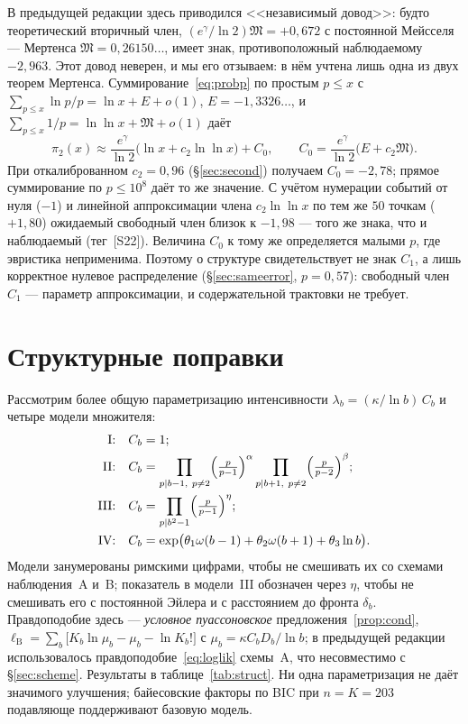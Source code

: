 \documentclass[11pt,a4paper]{article}
\theoremstyle{plain}
\theoremstyle{remark}
\newcommand{\eg}{e^{\gamma}}
\begin{document}
В предыдущей редакции здесь приводился <<независимый довод>>: будто теоретический
вторичный член, $(\eg/\ln2)\mathfrak M=+0{,}672$ с постоянной Мейсселя ---
Мертенса $\mathfrak M=0{,}26150\ldots$, имеет знак, противоположный наблюдаемому
$-2{,}963$. Этот довод неверен, и мы его отзываем: в нём учтена лишь одна из двух
теорем Мертенса. Суммирование~\eqref{eq:probp} по простым $p\le x$ с
$\sum_{p\le x}\ln p/p=\ln x+E+o(1)$, $E=-1{,}3326\ldots$, и
$\sum_{p\le x}1/p=\ln\ln x+\mathfrak M+o(1)$ даёт
\[
\pi_2(x)\approx\frac{\eg}{\ln2}\bigl(\ln x+c_2\ln\ln x\bigr)+C_0,\qquad
C_0=\frac{\eg}{\ln2}\bigl(E+c_2\mathfrak M\bigr).
\]
При откалиброванном $c_2=0{,}96$ (\S\ref{sec:second}) получаем $C_0=-2{,}78$; прямое
суммирование по $p\le10^8$ даёт то же значение. С учётом нумерации событий от нуля
($-1$) и линейной аппроксимации члена $c_2\ln\ln x$ по тем же $50$ точкам
($+1{,}80$) ожидаемый свободный член близок к $-1{,}98$ --- того же знака, что и
наблюдаемый (тег~[S22]). Величина $C_0$ к тому же определяется малыми $p$, где
эвристика неприменима. Поэтому о структуре свидетельствует не знак $C_1$, а лишь
корректное нулевое распределение (\S\ref{sec:sameerror}, $p=0{,}57$): свободный
член $C_1$ --- параметр аппроксимации, и содержательной трактовки не требует.

\section{Структурные поправки}\label{sec:struct}

Рассмотрим более общую параметризацию интенсивности $\lambda_b=(\kappa/\ln b)\,C_b$
и четыре модели множителя:
\begin{align*}
\text{I:}&\quad C_b=1;\\
\text{II:}&\quad C_b=\prod_{p\mid b-1,\ p\ne2}\Bigl(\tfrac{p}{p-1}\Bigr)^{\alpha}
                 \prod_{p\mid b+1,\ p\ne2}\Bigl(\tfrac{p}{p-2}\Bigr)^{\beta};\\
\text{III:}&\quad C_b=\prod_{p\mid b^2-1}\Bigl(\tfrac{p}{p-1}\Bigr)^{\eta};\\
\text{IV:}&\quad C_b=\exp\bigl(\theta_1\omega(b-1)+\theta_2\omega(b+1)+\theta_3\ln b\bigr).
\end{align*}
Модели занумерованы римскими цифрами, чтобы не смешивать их со схемами наблюдения~A
и~B; показатель в модели~III обозначен через $\eta$, чтобы не смешивать его с
постоянной Эйлера и с расстоянием до фронта $\delta_b$. Правдоподобие здесь --- \emph{условное пуассоновское}
предложения~\ref{prop:cond},
$\ell_{\mathrm B}=\sum_b\bigl[K_b\ln\mu_b-\mu_b-\ln K_b!\bigr]$ с
$\mu_b=\kappa C_b D_b/\ln b$; в предыдущей редакции использовалось
правдоподобие~\eqref{eq:loglik} схемы~A, что несовместимо с
\S\ref{sec:scheme}. Результаты в таблице~\ref{tab:struct}. Ни одна параметризация не
даёт значимого улучшения; байесовские факторы по BIC при $n=K=203$ подавляюще
поддерживают базовую модель.
\end{document}
